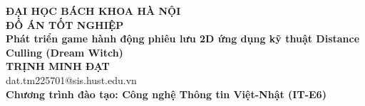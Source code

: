 \documentclass[DoAn.tex]{subfiles}
\begin{document}
\begin{titlepage}
\thispagestyle{empty}

\begin{center}

{\textbf{\large{ĐẠI HỌC BÁCH KHOA HÀ NỘI}}}\\[4cm]

{\textbf{\huge{ĐỒ ÁN TỐT NGHIỆP}}}\\[1cm]
{\textbf{\Large{Phát triển game hành động phiêu lưu 2D ứng dụng kỹ thuật Distance Culling (Dream Witch)}}}\\[1cm]

{\textbf{\large{TRỊNH MINH ĐẠT}}}\\
{\large{dat.tm225701@sis.hust.edu.vn}}\\[0.5cm]

{\textbf{\large{Chương trình đào tạo: Công nghệ Thông tin Việt-Nhật (IT-E6)}}}\\

\vspace{2cm}

\begin{table}[H]
\centering
{}
\end{table}
\end{center}

\end{titlepage}
\end{document}

